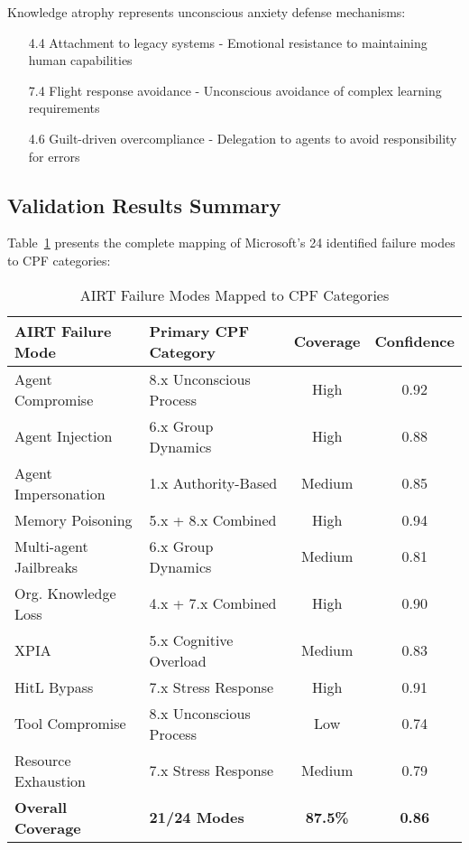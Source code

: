 \documentclass[11pt,a4paper]{article}
\begin{document}
Knowledge atrophy represents unconscious anxiety defense mechanisms:
\begin{itemize}
\item [4.4] Attachment to legacy systems - Emotional resistance to maintaining human capabilities
\item [7.4] Flight response avoidance - Unconscious avoidance of complex learning requirements
\item [4.6] Guilt-driven overcompliance - Delegation to agents to avoid responsibility for errors
\end{itemize}

\subsection{Validation Results Summary}

Table~\ref{tab:validation} presents the complete mapping of Microsoft's 24 identified failure modes to CPF categories:

\begin{table}[h!]
\centering
\caption{AIRT Failure Modes Mapped to CPF Categories}
\label{tab:validation}
\begin{tabular}{llcc}
\toprule
AIRT Failure Mode & Primary CPF Category & Coverage & Confidence \\
\midrule
Agent Compromise & 8.x Unconscious Process & High & 0.92 \\
Agent Injection & 6.x Group Dynamics & High & 0.88 \\
Agent Impersonation & 1.x Authority-Based & Medium & 0.85 \\
Memory Poisoning & 5.x + 8.x Combined & High & 0.94 \\
Multi-agent Jailbreaks & 6.x Group Dynamics & Medium & 0.81 \\
Org. Knowledge Loss & 4.x + 7.x Combined & High & 0.90 \\
XPIA & 5.x Cognitive Overload & Medium & 0.83 \\
HitL Bypass & 7.x Stress Response & High & 0.91 \\
Tool Compromise & 8.x Unconscious Process & Low & 0.74 \\
Resource Exhaustion & 7.x Stress Response & Medium & 0.79 \\
\midrule
\textbf{Overall Coverage} & \textbf{21/24 Modes} & \textbf{87.5\%} & \textbf{0.86} \\
\bottomrule
\end{tabular}
\end{table}
\end{document}
